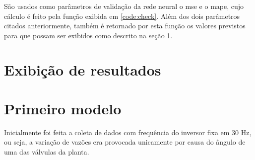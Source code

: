 \documentclass[12pt]{article}
\begin{document}


São usados como parâmetros de validação da rede neural o \acrfull{mse} e o \acrfull{mape}, cujo cálculo é feito pela função exibida em \ref{code:check}. Além dos dois parâmetros citados anteriormente, também é retornado por esta função os valores previstos para que possam ser exibidos como descrito na seção \ref{sec:exibicao}.

\section{Exibição de resultados}
\label{sec:exibicao}



\section {Primeiro modelo}

Inicialmente foi feita a coleta de dados com frequência do inversor fixa em 30 Hz, ou seja, a variação de vazões era provocada unicamente por causa do ângulo de uma das válvulas da planta.
\end{document}
